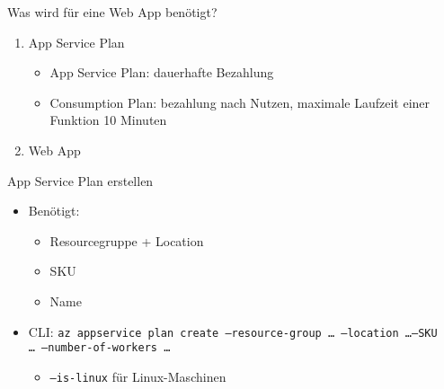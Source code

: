 

\begin{flashcard}[Definition]{Was wird für eine Web App benötigt?}
    \begin{enumerate}
        \item App Service Plan
            \begin{itemize}
                \item App Service Plan: dauerhafte Bezahlung
                \item Consumption Plan: bezahlung nach Nutzen, maximale Laufzeit einer Funktion 10 Minuten
            \end{itemize}
        \item Web App
    \end{enumerate}
\end{flashcard}



\begin{flashcard}[Definition]{App Service Plan erstellen}
    \begin{itemize}
        \item Benötigt:
        \begin{itemize}
            \item Resourcegruppe + Location
            \item SKU
            \item Name
        \end{itemize}
        \item CLI: \texttt{az appservice plan create --resource-group \ldots\ --location \ldots --SKU \ldots\ --number-of-workers \ldots}
            \begin{itemize}
                \item \texttt{--is-linux} für Linux-Maschinen
            \end{itemize}
    \end{itemize}
\end{flashcard}

